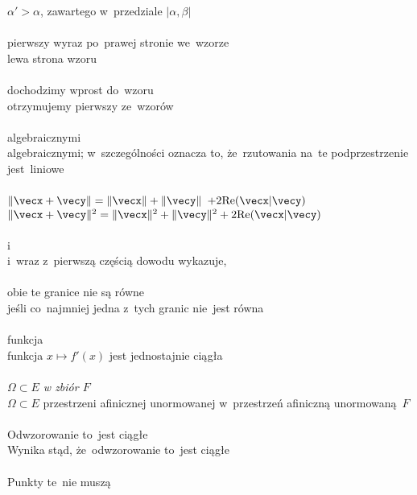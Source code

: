 \documentclass[a4paper,11pt]{article}
\numberwithin{equation}{section}
\begin{document}
\PowinnoByc $\alpha' > \alpha$, zawartego w~przedziale $| \alpha, \beta |$ \\
 \\
\Jest pierwszy wyraz po~prawej stronie we~wzorze \\
\PowinnoByc lewa strona wzoru \\
 \\
\Jest dochodzimy wprost do~wzoru \\
\PowinnoByc otrzymujemy pierwszy ze~wzorów \\
 \\
\Jest algebraicznymi \\
\PowinnoByc algebraicznymi; w~szczególności oznacza to, że~rzutowania na~te
podprzestrzenie jest~liniowe \\
 \\
\Jest
$\Vert \vecx + \vecy \Vert = \Vert \vecx \Vert + \Vert \vecy \Vert$
$+ 2 \ReLoc( \vecx | \vecy )$ \\
\PowinnoByc $\Vert \vecx + \vecy \Vert^{ 2 } = \Vert \vecx \Vert^{ 2 }
+ \Vert \vecy \Vert^{ 2 } + 2 \ReLoc( \vecx | \vecy )$ \\
 \\
\Jest i \\
\PowinnoByc i~wraz z~pierwszą częścią dowodu wykazuje, \\
 \\
\Jest obie te granice nie są równe \\
\PowinnoByc jeśli co~najmniej jedna z~tych granic nie~jest równa \\
 \\
\Jest funkcja \\
\PowinnoByc funkcja $x \mapsto f'( x )$ jest jednostajnie ciągła \\
 \\
\Jest \textit{$\Omega \subset E$ w zbiór $F$} \\
\PowinnoByc $\Omega \subset E$ przestrzeni afinicznej unormowanej
w~przestrzeń afiniczną unormowaną~$F$ \\
 \\
\Jest Odwzorowanie to~jest ciągłe \\
\PowinnoByc Wynika stąd, że~odwzorowanie to~jest ciągłe \\
 \\
\Jest Punkty te~nie muszą \\
\end{document}
